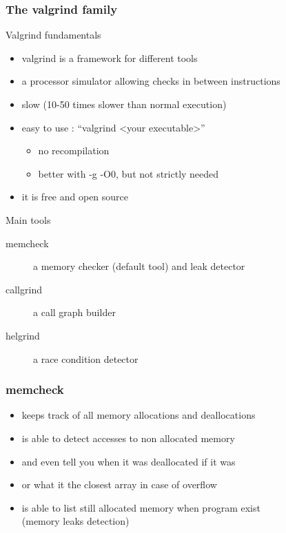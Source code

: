 \begin{frame}[fragile]
  \frametitle{The valgrind family}
  \begin{block}{Valgrind fundamentals}
    \begin{itemize}
    \item valgrind is a framework for different tools
    \item a processor simulator allowing checks in between instructions
    \item slow (10-50 times slower than normal execution)
    \item easy to use : ``valgrind \textless{}your executable\textgreater''
      \begin{itemize}
      \item no recompilation
      \item better with -g -O0, but not strictly needed
      \end{itemize}
    \item it is free and open source
    \end{itemize}
  \end{block}
  \pause
  \begin{block}{Main tools}
    \begin{description}
      \item[memcheck] a memory checker (default tool) and leak detector
      \item[callgrind] a call graph builder
      \item[helgrind] a race condition detector
    \end{description}
  \end{block}
\end{frame}

\begin{frame}[fragile]
  \frametitle{memcheck}
  \begin{block}{}
    \begin{itemize}
      \item keeps track of all memory allocations and deallocations
      \item is able to detect accesses to non allocated memory
      \item and even tell you when it was deallocated if it was
      \item or what it the closest array in case of overflow
      \item is able to list still allocated memory when program exist\\
        (memory leaks detection)
    \end{itemize}
  \end{block}
\end{frame}

